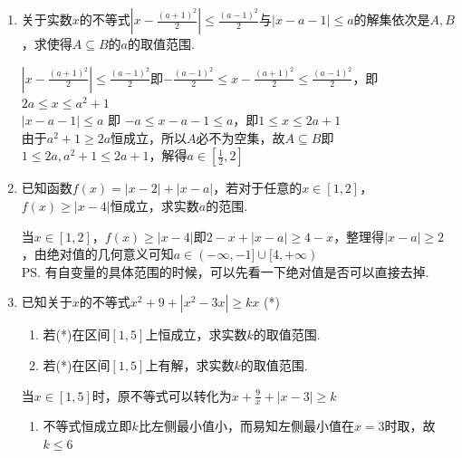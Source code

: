 \begin{enumerate}
\begin{jieda}
        前者解集为$(-\infty, -2] \cup [2, +\infty)$，后者解集为$[a-\sqrt{a^2+8}, a + \sqrt{a^2+8}]$，故$(-2, 2) \subseteq [a-\sqrt{a^2+8}, a + \sqrt{a^2+8}]$，因此$a \in [-1, 1]$
    \end{jieda}
    \begin{vspace_}
    \vsp[5]
    \end{vspace_}
    \item 关于实数$x$的不等式$\left | x - \frac{(a+1)^2}{2} \right | \leq \frac{(a-1)^2}{2}$与$|x-a-1| \leq a$的解集依次是$A, B$，求使得$A \subseteq B$的$a$的取值范围.
    \begin{jieda}
        $\left | x - \frac{(a+1)^2}{2} \right | \leq \frac{(a-1)^2}{2}$即$-\frac{(a-1)^2}{2} \leq x - \frac{(a+1)^2}{2} \leq \frac{(a-1)^2}{2}$，即$2a \leq x \leq a^2+1$ \\
        $|x-a-1| \leq a$ 即 $-a \leq x-a-1 \leq a$，即$1 \leq x \leq 2a+1$ \\
        由于$a^2+1 \geq 2a$恒成立，所以$A$必不为空集，故$A \subseteq B$即$1 \leq 2a, a^2+1 \leq 2a+1$，解得$a \in [\frac{1}{2}, 2]$
    \end{jieda}
    \begin{vspace_}
    \vsp[5]
    \end{vspace_}
    \item 已知函数$f(x) = |x-2| + |x-a|$，若对于任意的$x \in [1, 2]$，$f(x) \geq |x-4|$恒成立，求实数$a$的范围.
    \begin{jieda}
        当$x \in [1, 2]$，$f(x) \geq |x-4|$即$2-x + |x-a| \geq 4-x$，整理得$|x-a| \geq 2$，由绝对值的几何意义可知$a \in (-\infty, -1] \cup [4, +\infty)$ \\
        \ps 有自变量的具体范围的时候，可以先看一下绝对值是否可以直接去掉.
    \end{jieda}
    \begin{vspace_}
    \vsp[5]
    \end{vspace_}
    \item 已知关于$x$的不等式$x^2+9+|x^2-3x| \geq kx$ (*)
    \begin{enumerate}
        \item 若(*)在区间$[1,5]$上恒成立，求实数$k$的取值范围.
        \item 若(*)在区间$[1,5]$上有解，求实数$k$的取值范围.
    \end{enumerate}
    \begin{jieda}
        当$x \in [1, 5]$时，原不等式可以转化为$x + \frac{9}{x} + |x - 3| \geq k$
        \begin{enumerate}
            \item 不等式恒成立即$k$比左侧最小值小，而易知左侧最小值在$x = 3$时取，故$k \leq 6$

\end{enumerate}
\end{jieda}
\end{enumerate}
